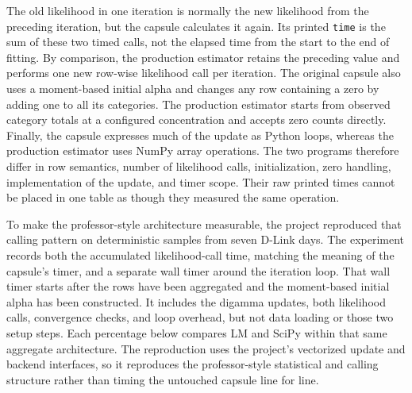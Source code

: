 \documentclass[11pt]{article}
\begin{document}
The old likelihood in one iteration is normally the new likelihood from the
preceding iteration, but the capsule calculates it again. Its printed
\texttt{time} is the sum of these two timed calls, not the elapsed time from the
start to the end of fitting. By comparison, the production estimator retains
the preceding value and performs one new row-wise likelihood call per
iteration. The original capsule also uses a moment-based initial alpha and
changes any row containing a zero by adding one to all its categories. The
production estimator starts from observed category totals at a configured
concentration and accepts zero counts directly. Finally, the capsule expresses
much of the update as Python loops, whereas the production estimator uses
NumPy array operations. The two programs therefore differ in row semantics,
number of likelihood calls, initialization, zero handling, implementation of
the update, and timer scope. Their raw printed times cannot be placed in one
table as though they measured the same operation.

To make the professor-style architecture measurable, the project reproduced
that calling pattern on deterministic samples from seven D-Link days. The
experiment records both the accumulated likelihood-call time, matching the
meaning of the capsule's timer, and a separate wall timer around the iteration
loop. That wall timer starts after the rows have been aggregated and the
moment-based initial alpha has been constructed. It includes the digamma
updates, both likelihood calls, convergence checks, and loop overhead, but not
data loading or those two setup steps. Each percentage below compares LM and
SciPy within that same aggregate architecture. The reproduction uses the
project's vectorized update and backend interfaces, so it reproduces the
professor-style statistical and calling structure rather than timing the
untouched capsule line for line.

\begin{table}[htbp]
\centering
\small
\caption{Professor-style aggregate experiment. Each time is the mean total for
fitting seven daily samples across three deterministic repeats.}
\label{tab:professor-style-times}
\end{table}
\end{document}
